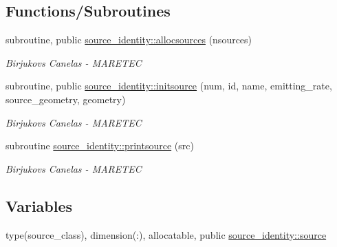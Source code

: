 \subsection*{Functions/\+Subroutines}
\begin{DoxyCompactItemize}
\item 
subroutine, public \mbox{\hyperlink{namespacesource__identity_a716b4cb4acec5756a6d4dcf20eee588e}{source\+\_\+identity\+::allocsources}} (nsources)
\begin{DoxyCompactList}\small\item\em Birjukovs Canelas -\/ M\+A\+R\+E\+T\+EC \end{DoxyCompactList}\item 
subroutine, public \mbox{\hyperlink{namespacesource__identity_a3939e59172252d0edce57e00ea41758d}{source\+\_\+identity\+::initsource}} (num, id, name, emitting\+\_\+rate, source\+\_\+geometry, geometry)
\begin{DoxyCompactList}\small\item\em Birjukovs Canelas -\/ M\+A\+R\+E\+T\+EC \end{DoxyCompactList}\item 
subroutine \mbox{\hyperlink{namespacesource__identity_ac4fc3a54de91016023a7948d261f84a5}{source\+\_\+identity\+::printsource}} (src)
\begin{DoxyCompactList}\small\item\em Birjukovs Canelas -\/ M\+A\+R\+E\+T\+EC \end{DoxyCompactList}\end{DoxyCompactItemize}
\subsection*{Variables}
\begin{DoxyCompactItemize}
\item 
type(source\+\_\+class), dimension(\+:), allocatable, public \mbox{\hyperlink{namespacesource__identity_a5ed8006613af7461c6a2ff1cdaeb8f0f}{source\+\_\+identity\+::source}}
\end{DoxyCompactItemize}
